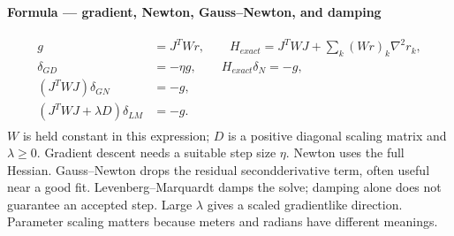 \documentclass[letterpaper,11pt,english,openany,oneside]{jupyterBook}
\begin{document}
\begin{TextbookBox}
\textbf{Formula — gradient, Newton, Gauss–Newton, and damping}\par\smallskip
\begin{equation}\label{equation:lectures/lecture06/optimization:eq-lec06-updates}
\begin{split}\begin{aligned}
g&=J^TWr,\qquad
H_{exact}=J^TWJ+\sum_k(Wr)_k\nabla^2r_k,\\
\delta_{GD}&=-\eta g,\qquad H_{exact}\delta_N=-g,\\
(J^TWJ)\delta_{GN}&=-g,\\
(J^TWJ+\lambda D)\delta_{LM}&=-g.
\end{aligned}\end{split}
\end{equation}
\sphinxAtStartPar
\(W\) is held constant in this expression; \(D\) is a positive diagonal scaling matrix and \(\lambda\ge0\). Gradient descent needs a suitable step size \(\eta\). Newton uses the full Hessian. Gauss–Newton drops the residual second\sphinxhyphen{}derivative term, often useful near a good fit. Levenberg–Marquardt damps the solve; damping alone does not guarantee an accepted step. Large \(\lambda\) gives a scaled gradient\sphinxhyphen{}like direction. Parameter scaling matters because meters and radians have different meanings.

\end{TextbookBox}
\end{document}
